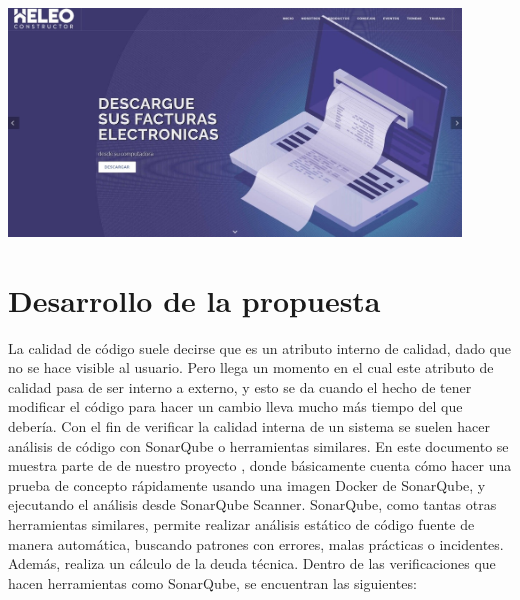 \documentclass[preprint,12pt]{elsarticle}
\begin{document}
\begin{itemize}
\begin{center}
	\includegraphics[width=12cm]{./imagen/3} 
	\end{center}
\end{itemize}

\section{Desarrollo de la propuesta}
La calidad de código suele decirse que es un atributo interno de calidad, dado que no se hace visible al usuario. Pero llega un momento en el cual este atributo de calidad pasa de ser interno a externo, y esto se da cuando el hecho de tener modificar el código para hacer un cambio lleva mucho más tiempo del que debería. Con el fin de verificar la calidad interna de un sistema se suelen hacer análisis de código con SonarQube o herramientas similares. En este documento se muestra parte de de nuestro proyecto , donde básicamente  cuenta cómo hacer una prueba de concepto rápidamente usando una imagen Docker de SonarQube, y ejecutando el análisis desde SonarQube Scanner.
SonarQube, como tantas otras herramientas similares, permite realizar análisis estático de código fuente de manera automática, buscando patrones con errores, malas prácticas o incidentes. Además, realiza un cálculo de la deuda técnica. Dentro de las verificaciones que hacen herramientas como SonarQube, se encuentran las siguientes:\cite{refaquino}
\end{document}
